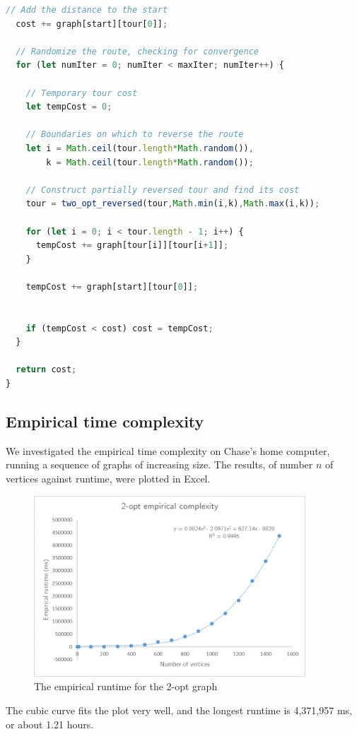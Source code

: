 \documentclass[10pt]{extarticle}
\begin{document}
\begin{lstlisting}[language=JavaScript]
  // Add the distance to the start
  cost += graph[start][tour[0]];
  
  // Randomize the route, checking for convergence
  for (let numIter = 0; numIter < maxIter; numIter++) {

    // Temporary tour cost
    let tempCost = 0;

    // Boundaries on which to reverse the route
    let i = Math.ceil(tour.length*Math.random()),
        k = Math.ceil(tour.length*Math.random());

    // Construct partially reversed tour and find its cost
    tour = two_opt_reversed(tour,Math.min(i,k),Math.max(i,k));

    for (let i = 0; i < tour.length - 1; i++) {
      tempCost += graph[tour[i]][tour[i+1]];
    }

    tempCost += graph[start][tour[0]];


    if (tempCost < cost) cost = tempCost;
  }

  return cost;
}
\end{lstlisting}


\subsection{Empirical time complexity}
We investigated the empirical time complexity on Chase's home computer,
running a sequence of graphs of increasing size. The results, of number
$n$ of vertices against runtime, were plotted in Excel.

\begin{figure}[ht]
    \centering
    \includegraphics[width=4in]{2Opt_trendline.png}
    \caption{The empirical runtime for the 2-opt graph}
    \label{fig:2}
\end{figure}

The cubic curve fits the plot very well, and the longest runtime is 4,371,957 ms,
or about 1.21 hours.
\end{document}
